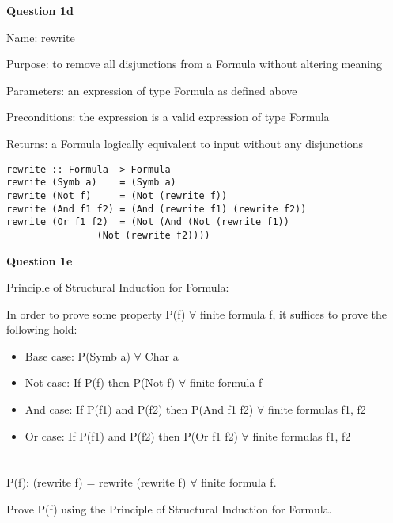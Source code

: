 \documentclass{article}
\begin{document}
\textbf{Question 1d}

Name: rewrite

Purpose: to remove all disjunctions from a Formula without altering meaning

Parameters: an expression of type Formula as defined above

Preconditions: the expression is a valid expression of type Formula

Returns: a Formula logically equivalent to input without any disjunctions

\begin{lstlisting}
rewrite :: Formula -> Formula
rewrite (Symb a)	= (Symb a)
rewrite (Not f)		= (Not (rewrite f))
rewrite (And f1 f2)	= (And (rewrite f1) (rewrite f2))
rewrite (Or f1 f2)	= (Not (And (Not (rewrite f1)) 
				(Not (rewrite f2))))
\end{lstlisting}

\textbf{Question 1e}

Principle of Structural Induction for Formula:

In order to prove some property P(f) $\forall$ finite formula f, it suffices
to prove the following hold:

\begin{itemize}
\item Base case: P(Symb a) $\forall$ Char a
\item Not case: If P(f) then P(Not f) $\forall$ finite formula f
\item And case: If P(f1) and P(f2) then P(And f1 f2) $\forall$ finite formulas
f1, f2
\item Or case: If P(f1) and P(f2) then P(Or f1 f2) $\forall$ finite formulas f1,
f2
\end{itemize}

\section{}

P(f): (rewrite f) = rewrite (rewrite f) $\forall$ finite formula f.

Prove P(f) using the Principle of Structural Induction for Formula.
\end{document}
